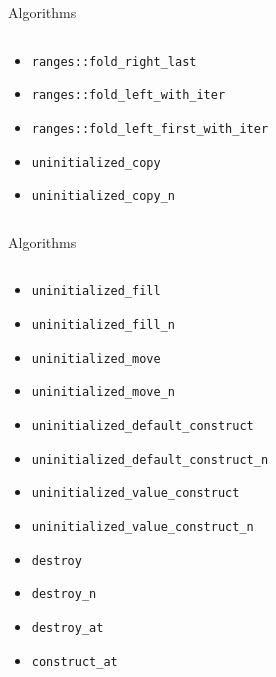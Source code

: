 \documentclass[aspectratio=169]{beamer}
\begin{document}
\begin{frame}{Algorithms}
\begin{columns}
\begin{column}{.33\textwidth}
\begin{itemize}
        \item{\texttt{ranges::fold_right_last}}
        \item{\texttt{ranges::fold_left_with_iter}}
        \item{\texttt{ranges::fold_left_first_with_iter}}
        \item{\texttt{uninitialized_copy}}
        \item{\texttt{uninitialized_copy_n}}
      \end{itemize}
    \end{column}
  \end{columns}
\end{frame}

\begin{frame}{Algorithms}
  \tiny
  \begin{columns}
    \begin{column}{.33\textwidth}
      \begin{itemize}
        \item{\texttt{uninitialized_fill}}
        \item{\texttt{uninitialized_fill_n}}
        \item{\texttt{uninitialized_move}}
        \item{\texttt{uninitialized_move_n}}
        \item{\texttt{uninitialized_default_construct}}
        \item{\texttt{uninitialized_default_construct_n}}
        \item{\texttt{uninitialized_value_construct}}
        \item{\texttt{uninitialized_value_construct_n}}
        \item{\texttt{destroy}}
        \item{\texttt{destroy_n}}
        \item{\texttt{destroy_at}}
        \item{\texttt{construct_at}}
      \end{itemize}
    \end{column}
    \begin{column}{.33\textwidth}
    \end{column}
    \begin{column}{.33\textwidth}
    \end{column}
  \end{columns}
\end{frame}
\end{document}

